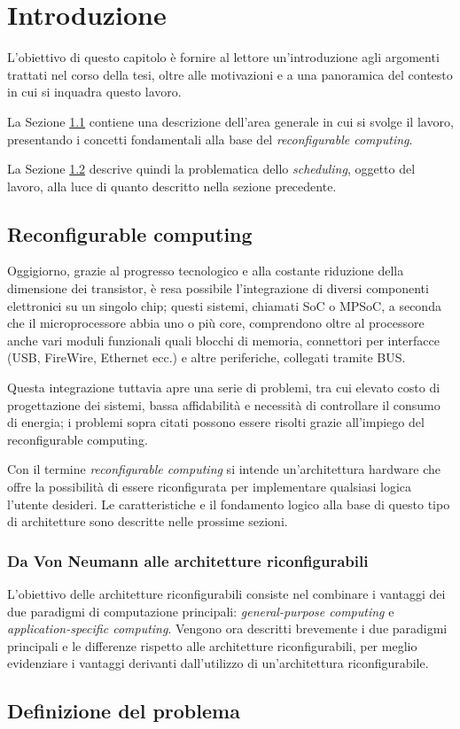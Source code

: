 \chapter{Introduzione}
\label{chap:intro}
\vspace{1cm}
L'obiettivo di questo capitolo è fornire al lettore un'introduzione agli argomenti 
trattati nel corso della tesi, oltre alle motivazioni e a una panoramica del contesto in 
cui si inquadra questo lavoro.

La Sezione \ref{sec:reconfComp} contiene una descrizione dell'area generale in cui si 
svolge il lavoro, presentando i concetti fondamentali alla base del \emph{reconfigurable 
computing}.

La Sezione \ref{sec:definizioneProblema} descrive quindi la problematica dello 
\emph{scheduling}, oggetto del lavoro, alla luce di quanto descritto nella sezione 
precedente.


\section{Reconfigurable computing}
\label{sec:reconfComp}
Oggigiorno, grazie al progresso tecnologico e alla costante riduzione della dimensione 
dei transistor, è resa possibile l'integrazione di diversi componenti elettronici su un 
singolo chip; questi sistemi, chiamati \ac{SoC} o \ac{MPSoC}, a seconda 
che il microprocessore abbia uno o più core, comprendono oltre al processore anche vari 
moduli funzionali quali blocchi di memoria, connettori per interfacce (USB, FireWire, 
Ethernet ecc.) e altre periferiche, collegati tramite BUS.

Questa integrazione tuttavia apre una serie di problemi, tra cui elevato costo di 
progettazione dei sistemi, bassa affidabilità e necessità di controllare il consumo di 
energia; i problemi sopra citati possono essere risolti grazie all'impiego del 
reconfigurable computing.

Con il termine \emph{reconfigurable computing} si intende un'architettura hardware che 
offre la possibilità di essere riconfigurata per implementare qualsiasi logica l'utente 
desideri. Le caratteristiche e il fondamento logico alla base di questo tipo di 
architetture sono descritte nelle prossime sezioni.

\subsection{Da Von Neumann alle architetture riconfigurabili}
\label{subsec:cambioParadigma}
L'obiettivo delle architetture riconfigurabili consiste nel combinare i 
vantaggi dei due paradigmi di computazione principali: \emph{general-purpose computing} e 
\emph{application-specific computing}. Vengono ora descritti brevemente i due paradigmi 
principali e le differenze rispetto alle architetture riconfigurabili, per meglio 
evidenziare i vantaggi derivanti dall'utilizzo di un'architettura riconfigurabile.


\section{Definizione del problema}
\label{sec:definizioneProblema}

